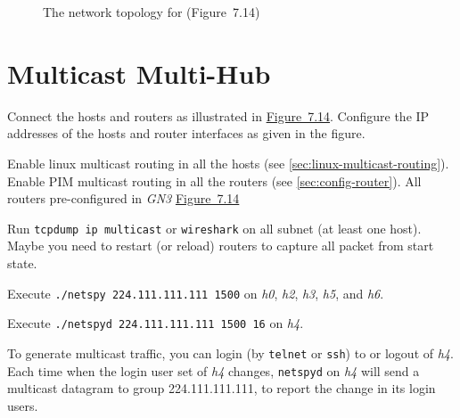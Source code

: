 \documentclass{../UTNetLab}
\begin{document}
\begin{figure}[H]
        \caption{The network topology for  (Figure~7.14)}
        \label{fig:7.14}
    \end{figure}

\section{Multicast Multi-Hub}
    Connect the hosts and routers as illustrated in \hyperref[fig:7.14]{Figure~7.14}.
    Configure the IP addresses of the hosts and router interfaces as given in the figure.


    Enable linux multicast routing in all the hosts (see \autoref{sec:linux-multicast-routing}).
    Enable PIM multicast routing in all the routers (see \autoref{sec:config-router}).
    All routers pre-configured in \textit{GN3} \hyperref[fig:7.14]{Figure~7.14}

    Run \lstinline{tcpdump ip multicast} or \lstinline{wireshark} on all subnet (at least one host).
    Maybe you need to restart (or reload) routers to capture all packet from start state.

    Execute \lstinline{./netspy 224.111.111.111 1500} on \textit{h0}, \textit{h2}, \textit{h3}, \textit{h5}, and \textit{h6}.

    Execute \lstinline{./netspyd 224.111.111.111 1500 16} on \textit{h4}.
    
    To generate multicast traffic, you can login (by \lstinline{telnet} or \lstinline{ssh}) to or logout of \textit{h4}.
    Each time when the login user set of \textit{h4} changes, \lstinline{netspyd} on \textit{h4} will send a multicast datagram to group 224.111.111.111, to report the change in its login users.
\end{document}
